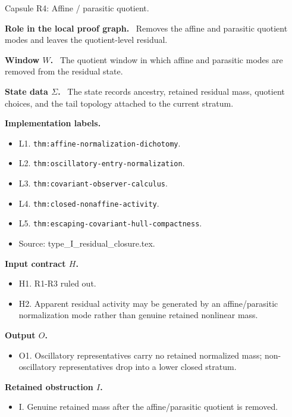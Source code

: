 \documentclass[11pt]{amsart}
\newcommand{\capsulefield}[1]{\par\smallskip\noindent\textbf{#1.}\ }
\begin{document}
\begin{proofcapsule}{Capsule R4: Affine / parasitic quotient.}
  \capsulefield{Role in the local proof graph}
  Removes the affine and parasitic quotient modes and leaves the quotient-level residual.

  \capsulefield{Window \(W\)}
The quotient window in which affine and parasitic modes are removed from the residual state.

  \capsulefield{State data \(\Sigma\)}
The state records ancestry, retained residual mass, quotient choices, and the tail topology attached to the current stratum.

  \capsulefield{Implementation labels}
  \begin{itemize}[leftmargin=1.8em]
  \item L1. \texttt{thm:affine-normalization-dichotomy}.
  \item L2. \texttt{thm:oscillatory-entry-normalization}.
  \item L3. \texttt{thm:covariant-observer-calculus}.
  \item L4. \texttt{thm:closed-nonaffine-activity}.
  \item L5. \texttt{thm:escaping-covariant-hull-compactness}.
  \item Source: type\_I\_residual\_closure.tex.
  \end{itemize}

  \capsulefield{Input contract \(H\)}
  \begin{itemize}[leftmargin=1.8em]
  \item H1. R1-R3 ruled out.
  \item H2. Apparent residual activity may be generated by an affine/parasitic normalization mode rather than genuine retained nonlinear mass.
  \end{itemize}

  \capsulefield{Output \(O\)}
  \begin{itemize}[leftmargin=1.8em]
  \item O1. Oscillatory representatives carry no retained normalized mass; non-oscillatory representatives drop into a lower closed stratum.
  \end{itemize}

  \capsulefield{Retained obstruction \(I\)}
  \begin{itemize}[leftmargin=1.8em]
  \item I. Genuine retained mass after the affine/parasitic quotient is removed.
  \end{itemize}


\end{proofcapsule}
\end{document}
